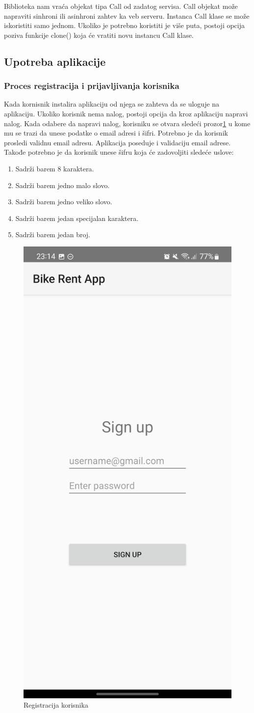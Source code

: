 \documentclass[12pt,oneside]{memoir}
\begin{document}
Biblioteka nam vraća objekat tipa Call od zadatog servisa. Call objekat može napraviti sinhroni ili asinhroni zahtev ka veb serveru. Instanca Call klase se može iskoristiti samo jednom. Ukoliko je potrebno koristiti je više puta, postoji opcija poziva funkcije clone() koja će vratiti novu instancu Call klase.
 
\subsection{Upotreba aplikacije}
 
\subsubsection{Proces registracija i prijavljivanja korisnika}
 
Kada kornisnik instalira aplikaciju od njega se zahteva da se uloguje na aplikaciju. Ukoliko korisnik nema nalog, postoji opcija da kroz aplikaciju napravi nalog. Kada odabere da napravi nalog, korisniku se otvara sledeći prozor\ref{fig:registracijaKorisnika} u kome mu se trazi da unese podatke o email adresi i šifri. Potrebno je da korisnik prosledi validnu email adresu. Aplikacija poseduje i validaciju email adrese. Takođe potrebno je da korisnik unese šifru koja će zadovoljiti sledeće uslove:

\begin{enumerate}
  \item Sadrži barem 8 karaktera.
  \item Sadrži barem jedno malo slovo.
  \item Sadrži barem jedno veliko slovo.
  \item Sadrži barem jedan specijalan karaktera.
  \item Sadrži barem jedan broj.
\end{enumerate}
 
\begin{figure}[!ht]
  \centering
  \includegraphics[height=0.5\textwidth]{Registracija.jpg}
  \caption{Registracija korisnika}
  \label{fig:registracijaKorisnika}
\end{figure}
\end{document}
